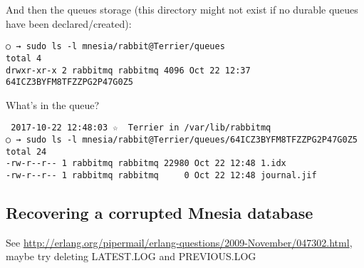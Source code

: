 And then the queues storage (this directory might not exist if no durable queues have been declared/created):
\begin{verbatim}
○ → sudo ls -l mnesia/rabbit@Terrier/queues
total 4
drwxr-xr-x 2 rabbitmq rabbitmq 4096 Oct 22 12:37 64ICZ3BYFM8TFZZPG2P47G0Z5
\end{verbatim}

What's in the queue?
\begin{verbatim}
 2017-10-22 12:48:03 ☆  Terrier in /var/lib/rabbitmq
○ → sudo ls -l mnesia/rabbit@Terrier/queues/64ICZ3BYFM8TFZZPG2P47G0Z5
total 24
-rw-r--r-- 1 rabbitmq rabbitmq 22980 Oct 22 12:48 1.idx
-rw-r--r-- 1 rabbitmq rabbitmq     0 Oct 22 12:48 journal.jif
\end{verbatim}


	\subsection{Recovering a corrupted Mnesia database}
	See \url{http://erlang.org/pipermail/erlang-questions/2009-November/047302.html}, maybe try deleting LATEST.LOG and PREVIOUS.LOG
